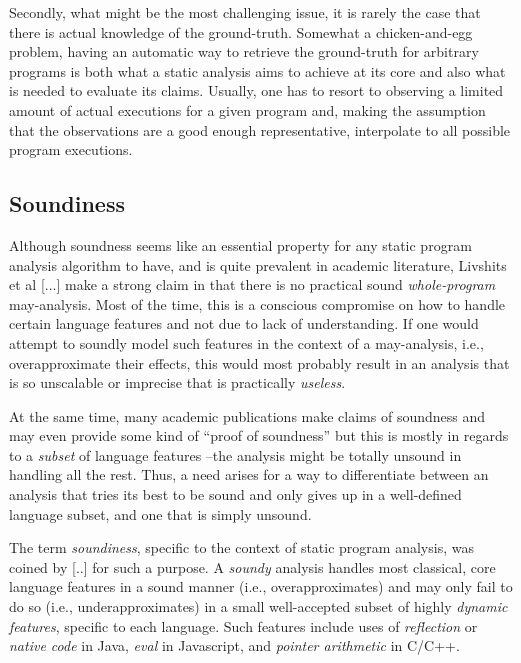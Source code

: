 Secondly, what might be the most challenging issue, it is rarely the case that there is actual knowledge of the ground-truth. Somewhat a chicken-and-egg problem, having an automatic way to retrieve the ground-truth for arbitrary programs is both what a static analysis aims to achieve at its core and also what is needed to evaluate its claims. Usually, one has to resort to observing a limited amount of actual executions for a given program and, making the assumption that the observations are a good enough representative, interpolate to all possible program executions.

\subsection{Soundiness}

Although soundness seems like an essential property for any static program analysis algorithm to have, and is quite prevalent in academic literature, Livshits et al [...] make a strong claim in that there is no practical sound \emph{whole-program} may-analysis. Most of the time, this is a conscious compromise on how to handle certain language features and not due to lack of understanding. If one would attempt to soundly model such features in the context of a may-analysis, i.e., overapproximate their effects, this would most probably result in an analysis that is so unscalable or imprecise that is practically \emph{useless}.

At the same time, many academic publications make claims of soundness and may even provide some kind of ``proof of soundness'' but this is mostly in regards to a \emph{subset} of language features --the analysis might be totally unsound in handling all the rest. Thus, a need arises for a way to differentiate between an analysis that tries its best to be sound and only gives up in a well-defined language subset, and one that is simply unsound.

The term \emph{soundiness}, specific to the context of static program analysis, was coined by [..] for such a purpose. A \emph{soundy} analysis handles most classical, core language features in a sound manner (i.e., overapproximates) and may only fail to do so (i.e., underapproximates) in a small well-accepted subset of highly \emph{dynamic features}, specific to each language. Such features include uses of \emph{reflection} or \emph{native code} in Java, \emph{eval} in Javascript, and \emph{pointer arithmetic} in C/C++.

\subsection{}

